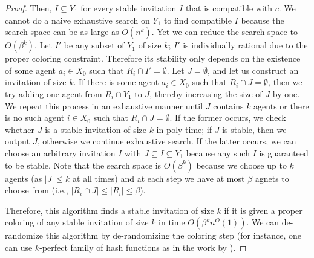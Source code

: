 \begin{proof}
	Then, $I \subseteq Y_1$ for every stable invitation $I$ that is compatible with $c$. We cannot do a naive exhaustive search on $Y_1$ to find compatible $I$ because the search space can be as large as $O(n^k)$. Yet we can reduce the search space to $O(\beta^k)$. Let $I'$ be any subset of $Y_1$ of size $k$; $I'$ is individually rational due to the proper coloring constraint. Therefore its stability only depends on the existence of some agent $a_i \in X_0$ such that $R_i \cap I' = \emptyset$. Let $J = \emptyset$, and let us construct an invitation of size $k$. If there is some agent $a_i\in X_0$ such that $R_i \cap J = \emptyset$, then we try adding one agent from $R_i \cap Y_1$ to $J$, thereby increasing the size of $J$ by one. We repeat this process in an exhaustive manner until $J$ contains $k$ agents or there is no such agent $i \in X_0$ such that $R_i \cap J = \emptyset$. If the former occurs, we check whether $J$ is a stable invitation of size $k$ in poly-time; if $J$ is stable, then we output $J$, otherwise we continue exhaustive search. If the latter occurs, we can choose an arbitrary invitation $I$ with $J\subseteq I \subseteq Y_1$ because any such $I$ is guaranteed to be stable. Note that the search space is $O(\beta^k)$ because we choose up to $k$ agents (as $|J| \leq k$ at all times) and at each step we have at most $\beta$ agnets to choose from (i.e., $|R_i \cap J| \leq |R_i| \leq \beta$). 

	Therefore, this algorithm finds a stable invitation of size $k$ if it is given a proper coloring of any stable invitation of size $k$ in time $O(\beta^k n^O(1))$. We can de-randomize this algorithm by de-randomizing the coloring step (for instance, one can use $k$-perfect family of hash functions as in the work by \cite{ColorCoding}).
\end{proof}




